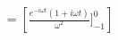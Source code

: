 \documentclass[preview]{standalone}
\begin{document}
\begin{align*}
&=\left[\frac{e^{-i\omega t}(1+i\omega t)}{\omega^{2}}]_{-1}^{0}\right] \\
\end{align*}
\end{document}
